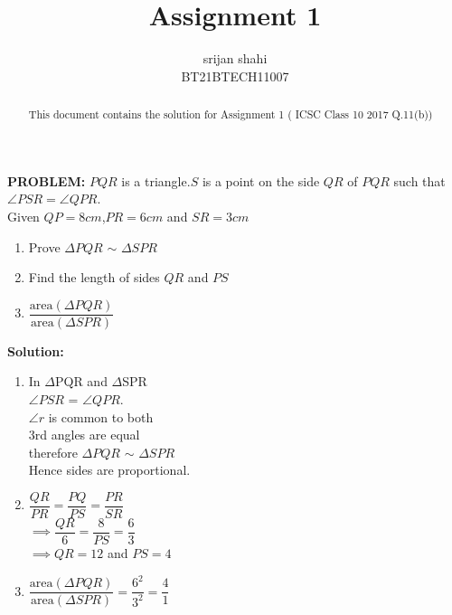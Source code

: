 \documentclass[journal,12pt,twocolumn]{IEEEtran}
\title{Assignment 1}
\author{srijan shahi\\BT21BTECH11007}
\date{}
\newcommand{\PROBLEM}{\noindent \textbf{PROBLEM: }}
\newcommand{\solution}{\noindent \textbf{Solution: }}
\begin{document}
\maketitle
\begin{abstract}
	This document contains the solution for Assignment 1 (	ICSC Class 10 2017 Q.11(b))
\end{abstract}

\PROBLEM $ PQR $ is a triangle.$  S $ is a point on the side $ QR $ of $ PQR $ such that $\angle{PSR} = \angle{QPR}$.\\
Given $  QP = 8 cm$,$  PR = 6 cm $ and $ SR = 3 cm $\\
\begin{enumerate}
	\item  Prove $\Delta{PQR}$ $\sim$ $\Delta{SPR}$\\
	\item Find the length of sides $  QR $ and $ PS $\\
	\item $\dfrac{\text{area}(\Delta{PQR})}{\text{area} (\Delta{SPR})}$
\end{enumerate}

\solution

\begin{enumerate}
	\item In $ {\Delta}  $PQR and $ {\Delta} $SPR\\
	$\angle{PSR}$ = $\angle{QPR}$.\\
	$\angle{r}$ is common to both\\
	3rd angles are equal\\
	therefore $\Delta{PQR}$ $\sim$ $\Delta{SPR}$\\
	Hence sides are proportional.\\
	
	\item $\dfrac{QR}{PR} =\dfrac{PQ}{PS}=\dfrac{PR}{SR}$\\
	
	$\implies \dfrac{QR}{6}=\dfrac{8}{PS}=\dfrac{6}{3}$\\
	
	$ \implies QR=12  $  and $ PS = 4 $\\
	
	\item $\dfrac{\text{area}(\Delta{PQR})}{\text{area} (\Delta{SPR})} = \dfrac{6^2}{3^2}=\dfrac{4}{1}$
	
	
\end{enumerate}
\end{document}
